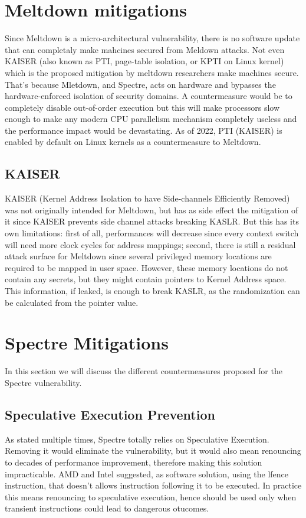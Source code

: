\section{Meltdown mitigations}
Since Meltdown is a micro-architectural vulnerability, there is no software update that can completaly make mahcines secured from Meldown attacks.
Not even KAISER (also known as PTI, page-table isolation, or KPTI on Linux kernel) which is the proposed
mitigation by meltdown researchers make machines secure. That's because
Mletdown, and Spectre, acts on hardware and bypasses the hardware-enforced isolation of security domains.
A countermeasure would be to completely disable out-of-order execution but this will make processors slow enough to make any modern CPU parallelism mechanism
completely useless and the performance impact would be devastating. As of 2022, PTI (KAISER) is enabled by default on Linux kernels as a countermeasure to Meltdown.

\subsection{KAISER}
KAISER (Kernel Address Isolation to have Side-channels Efficiently Removed) was not originally intended for Meltdown, but has as side effect the mitigation of it
since KAISER prevents side channel attacks breaking KASLR. But this has its own limitations: first of all, performances will decrease since every context switch will
need more clock cycles for address mappings; second, there is still a residual attack surface for Meltdown since several privileged memory locations are required
to be mapped in user space. However, these memory locations do not contain any secrets, but they might contain pointers to Kernel Address space. This information, if leaked,
is enough to break KASLR, as the randomization can be calculated from the pointer value.

\section{Spectre Mitigations}
In this section we will discuss the different countermeasures proposed for the Spectre vulnerability.
\subsection{Speculative Execution Prevention}
As stated multiple times, Spectre totally relies on Speculative Execution. 
Removing it would eliminate the vulnerability, but it would also mean renouncing to decades of performance improvement, therefore making this solution impracticable.
AMD and Intel suggested, as software solution, using the lfence instruction, that doesn't allows instruction following it to be executed.
In practice this means renouncing to speculative execution, hence should be used only when transient instructions could lead to dangerous otucomes.
